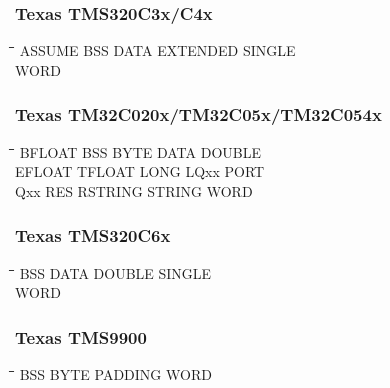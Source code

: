 \subsubsection{Texas TMS320C3x/C4x}
{\tt\begin{tabbing}
\hspace{3cm}\=\hspace{3cm}\=\hspace{3cm}\=\hspace{3cm}\=\kill
ASSUME     \> BSS         \> DATA        \> EXTENDED    \> SINGLE \\
WORD \\
\end{tabbing}}

\subsubsection{Texas TM32C020x/TM32C05x/TM32C054x}
{\tt\begin{tabbing}
\hspace{3cm}\=\hspace{3cm}\=\hspace{3cm}\=\hspace{3cm}\=\kill
BFLOAT     \> BSS         \> BYTE        \> DATA        \> DOUBLE \\
EFLOAT     \> TFLOAT      \> LONG        \> LQxx        \> PORT \\
Qxx        \> RES         \> RSTRING     \> STRING      \> WORD \\
\end{tabbing}}

\subsubsection{Texas TMS320C6x}
{\tt\begin{tabbing}
\hspace{3cm}\=\hspace{3cm}\=\hspace{3cm}\=\hspace{3cm}\=\kill
BSS         \> DATA        \> DOUBLE     \> SINGLE \\
WORD \\
\end{tabbing}}

\subsubsection{Texas TMS9900}
{\tt\begin{tabbing}
\hspace{3cm}\=\hspace{3cm}\=\hspace{3cm}\=\hspace{3cm}\=\kill
BSS        \> BYTE        \> PADDING     \> WORD \\
\end{tabbing}}

